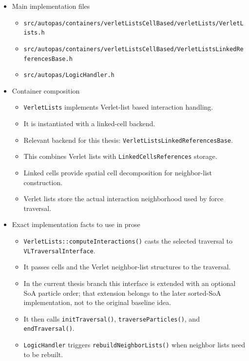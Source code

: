 \begin{itemize}
    \item Main implementation files
    \begin{itemize}
        \item \texttt{src/autopas/containers/verletListsCellBased/verletLists/VerletLists.h}
        \item \texttt{src/autopas/containers/verletListsCellBased/VerletListsLinkedReferencesBase.h}
        \item \texttt{src/autopas/LogicHandler.h}
    \end{itemize}

    \item Container composition
    \begin{itemize}
        \item \texttt{VerletLists} implements Verlet-list based interaction handling.
        \item It is instantiated with a linked-cell backend.
        \item Relevant backend for this thesis: \texttt{VerletListsLinkedReferencesBase}.
        \item This combines Verlet lists with \texttt{LinkedCellsReferences} storage.
        \item Linked cells provide spatial cell decomposition for neighbor-list construction.
        \item Verlet lists store the actual interaction neighborhood used by force traversal.
    \end{itemize}

    \item Exact implementation facts to use in prose
    \begin{itemize}
        \item \texttt{VerletLists::computeInteractions()} casts the selected traversal to \texttt{VLTraversalInterface}.
        \item It passes cells and the Verlet neighbor-list structures to the traversal.
        \item In the current thesis branch this interface is extended with an optional SoA particle order; that extension belongs to the later sorted-SoA implementation, not to the original baseline idea.
        \item It then calls \texttt{initTraversal()}, \texttt{traverseParticles()}, and \texttt{endTraversal()}.
        \item \texttt{LogicHandler} triggers \texttt{rebuildNeighborLists()} when neighbor lists need to be rebuilt.
    \end{itemize}


\end{itemize}
